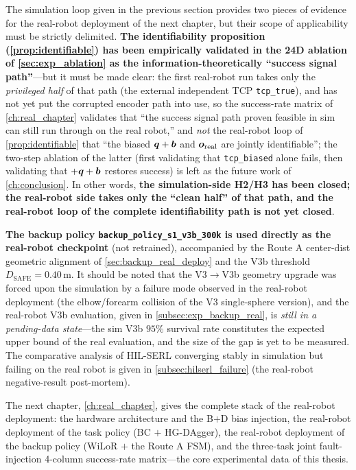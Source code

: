 The simulation loop given in the previous section provides two pieces of evidence for the real-robot deployment of the next chapter, but their scope of applicability must be strictly delimited. \textbf{The identifiability proposition (\cref{prop:identifiable}) has been empirically validated in the 24D ablation of \cref{sec:exp_ablation} as the information-theoretically ``success signal path''}---but it must be made clear: the first real-robot run takes only the \emph{privileged half} of that path (the external independent TCP \texttt{tcp\_true}), and has not yet put the corrupted encoder path into use, so the success-rate matrix of \cref{ch:real_chapter} validates that ``the success signal path proven feasible in sim can still run through on the real robot,'' and \emph{not} the real-robot loop of \cref{prop:identifiable} that ``the biased $\bm{q}+\bm{b}$ and $\bm{o}_\text{real}$ are jointly identifiable''; the two-step ablation of the latter (first validating that \texttt{tcp\_biased} alone fails, then validating that $+\bm{q}+\bm{b}$ restores success) is left as the future work of \cref{ch:conclusion}. In other words, \textbf{the simulation-side H2/H3 has been closed; the real-robot side takes only the ``clean half'' of that path, and the real-robot loop of the complete identifiability path is not yet closed}.

\textbf{The backup policy \texttt{backup\_policy\_s1\_v3b\_300k} is used directly as the real-robot checkpoint} (not retrained), accompanied by the Route A center-dist geometric alignment of \cref{sec:backup_real_deploy} and the V3b threshold $D_\text{SAFE} = 0.40$\,m. It should be noted that the V3$\to$V3b geometry upgrade was forced upon the simulation by a failure mode observed in the real-robot deployment (the elbow/forearm collision of the V3 single-sphere version), and the real-robot V3b evaluation, given in \cref{subsec:exp_backup_real}, is \emph{still in a pending-data state}---the sim V3b $95\%$ survival rate constitutes the expected upper bound of the real evaluation, and the size of the gap is yet to be measured. The comparative analysis of HIL-SERL converging stably in simulation but failing on the real robot is given in \cref{subsec:hilserl_failure} (the real-robot negative-result post-mortem).

The next chapter, \cref{ch:real_chapter}, gives the complete stack of the real-robot deployment: the hardware architecture and the B$+$D bias injection, the real-robot deployment of the task policy (BC $+$ HG-DAgger), the real-robot deployment of the backup policy (WiLoR $+$ the Route A FSM), and the three-task joint fault-injection 4-column success-rate matrix---the core experimental data of this thesis.
